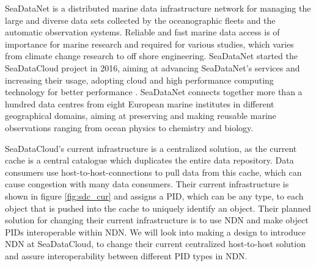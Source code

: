 SeaDataNet is a distributed marine data infrastructure network for managing the large and diverse data sets collected by the oceanographic fleets and the automatic observation systems. Reliable and fast marine data access is of importance for marine research and required for various studies, which varies from climate change research to off shore engineering. SeaDataNet started the SeaDataCloud project in 2016, aiming at advancing SeaDataNet's services and increasing their usage, adopting cloud and high performance computing technology for better performance \cite{sdc}. SeaDataNet connects together more than a hundred data centres from eight European marine institutes in different geographical domains, aiming at preserving and making reusable marine observations ranging from ocean physics to chemistry and biology.

SeaDataCloud's current infrastructure is a centralized solution, as the current cache is a central catalogue which duplicates the entire data repository. Data consumers use host-to-host-connections to pull data from this cache, which can cause congestion with many data consumers. Their current infrastructure is shown in figure \ref{fig:sdc_cur} and assigns a PID, which can be any type, to each object that is pushed into the cache to uniquely identify an object. Their planned solution for changing their current infrastructure is to use NDN and make object PIDs interoperable within NDN. We will look into making a design to introduce NDN at SeaDataCloud, to change their current centralized host-to-host solution and assure interoperability between different PID types in NDN.



